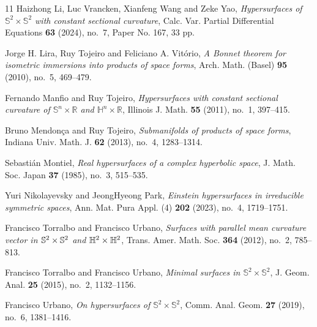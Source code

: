 \documentclass[reqno]{amsart}%
\theoremstyle{definition}
\numberwithin{equation}{section}
\begin{document}
\begin{thebibliography}{11}
Haizhong Li, Luc Vrancken, Xianfeng Wang and Zeke Yao,
\emph{Hypersurfaces of $\mathbb{S}^2\times\mathbb{S}^2$ with constant sectional curvature},
Calc. Var. Partial Differential Equations \textbf{63} (2024), no.~7, Paper No. 167, 33 pp.

Jorge H. Lira, Ruy Tojeiro and Feliciano A. Vit\'{o}rio,
\emph{A {B}onnet theorem for
isometric immersions into products of space forms}, Arch. Math. (Basel)
\textbf{95} (2010), no.~5, 469--479. 



Fernando Manfio and Ruy Tojeiro, \emph{Hypersurfaces with constant sectional curvature of
$\mathbb{S}^n\times \mathbb{R}$ and $\mathbb{H}^n\times \mathbb{R}$},
Illinois J. Math. \textbf{55} (2011), no.~1, 397--415. 

Bruno Mendon\c{c}a and Ruy Tojeiro, \emph{Submanifolds of products of space forms},
Indiana Univ. Math. J. \textbf{62} (2013), no.~4, 1283--1314. 

Sebasti\'{a}n Montiel, \emph{Real hypersurfaces of a complex hyperbolic space},
J. Math. Soc. Japan \textbf{37} (1985), no.~3, 515--535. 

Yuri Nikolayevsky and JeongHyeong Park, \emph{Einstein hypersurfaces in irreducible symmetric spaces},
Ann. Mat. Pura Appl. (4) \textbf{202} (2023), no.~4, 1719--1751. 

Francisco Torralbo and Francisco Urbano, \emph{Surfaces with parallel mean
curvature vector in {${\Bbb S}^2\times{\Bbb S}^2$} and
{${\Bbb H}^2\times{\Bbb H}^2$}}, Trans. Amer. Math. Soc. \textbf{364} (2012), no.~2,
785--813. 

Francisco Torralbo and Francisco Urbano, \emph{Minimal surfaces in {$\mathbb{S}^2\times\mathbb{S}^2$}}, J. Geom. Anal. \textbf{25} (2015), no.~2, 1132--1156. 

Francisco Urbano, \emph{On hypersurfaces of {$\mathbb S^2\times\mathbb S^2$}}, Comm.
Anal. Geom. \textbf{27} (2019), no.~6, 1381--1416. 


\end{thebibliography}
\end{document}
